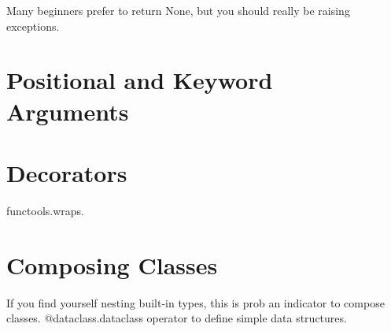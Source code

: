 \documentclass{article}
\begin{document}
  Many beginners prefer to return None, but you should really be raising exceptions. 

\section{Positional and Keyword Arguments} 

\section{Decorators}

  functools.wraps. 

\section{Composing Classes}

  If you find yourself nesting built-in types, this is prob an indicator to compose classes. @dataclass.dataclass operator to define simple data structures. 
\end{document}
